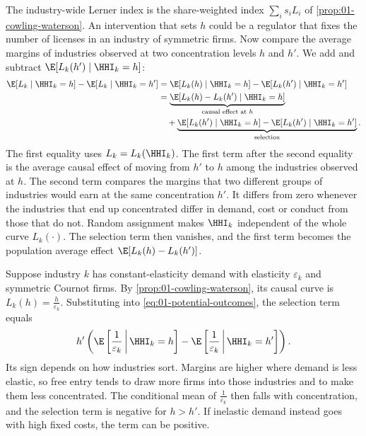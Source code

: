 The industry-wide Lerner index is the share-weighted index $\sum_i s_i L_i$ of
\cref{prop:01-cowling-waterson}. An intervention that sets $h$ could be a regulator that fixes the number
of licenses in an industry of symmetric firms. Now compare the average margins of industries observed at
two concentration levels $h$ and $h'$. We add and subtract $\E[L_k(h') \mid \HHI_k = h]$:
\begin{align}
\E[L_k \mid \HHI_k = h] - \E[L_k \mid \HHI_k = h']
  &= \E[L_k(h) \mid \HHI_k = h] - \E[L_k(h') \mid \HHI_k = h'] \notag \\
  &= \underbrace{\E[L_k(h) - L_k(h') \mid \HHI_k = h]}_{\text{causal effect at } h} \notag \\
  &\quad + \underbrace{\E[L_k(h') \mid \HHI_k = h] - \E[L_k(h') \mid \HHI_k = h']}_{\text{selection}}.
  \label{eq:01-potential-outcomes}
\end{align}
The first equality uses $L_k = L_k(\HHI_k)$. The first term after the second equality is the average
causal effect of moving from $h'$ to $h$ among the industries observed at $h$. The second term compares
the margins that
two different groups of industries would earn at the same concentration $h'$. It differs from zero
whenever the industries that end up concentrated differ in demand, cost or conduct from those that do
not. Random assignment makes $\HHI_k$ independent of the whole curve $L_k(\cdot)$. The selection term
then vanishes, and the first term becomes the population average effect $\E[L_k(h) - L_k(h')]$.

\begin{example}\label{ex:01-selection-elasticity}
Suppose industry $k$ has constant-elasticity demand with elasticity $\varepsilon_k$ and symmetric
Cournot firms. By \cref{prop:01-cowling-waterson}, its causal curve is
$L_k(h) = \frac{h}{\varepsilon_k}$. Substituting into \eqref{eq:01-potential-outcomes}, the selection
term equals
\[
h' \left( \E\left[\frac{1}{\varepsilon_k} \,\middle|\, \HHI_k = h\right]
        - \E\left[\frac{1}{\varepsilon_k} \,\middle|\, \HHI_k = h'\right] \right).
\]
Its sign depends on how industries sort. Margins are higher where demand is less elastic, so free entry
tends to draw more firms into those industries and to make them less concentrated. The conditional mean
of $\frac{1}{\varepsilon_k}$ then falls with concentration, and the selection term is negative for
$h > h'$. If inelastic demand instead goes with high fixed costs, the term can be positive.
\end{example}

